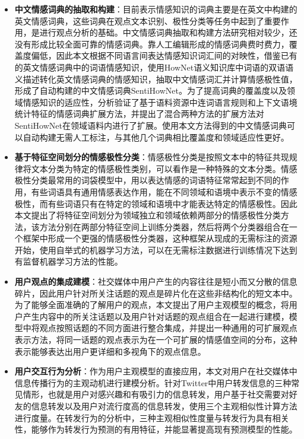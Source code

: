 \begin{cabstract}
\begin{itemize}
\item \textbf{中文情感词典的抽取和构建}：目前表示情感知识的词典主要是在英文中构建的英文情感词典，这些词典在观点文本识别、极性分类等任务中起到了重要作用，是进行观点分析的基础。中文情感词典抽取和构建方法研究相对较少，还没有形成比较全面可靠的情感词典。靠人工编辑形成的情感词典费时费力，覆盖度偏低，因此本文根据不同语言间表达情感知识词汇间的对映性，借鉴已有的英文情感词典中的词语情感知识，使用HowNet语义知识库中词语的双语语义描述转化英文情感词典的情感知识，抽取中文情感词汇并计算情感极性值，形成了自动构建的中文情感词典SentiHowNet。为了提高词典的覆盖度以及领域情感知识的适应性，分析验证了基于语料资源中连词语言规则和上下文语境统计特征的情感词典扩展方法，并提出了混合两种方法的扩展方法对SentiHowNet在领域语料内进行了扩展。使用本文方法得到的中文情感词典可以自动构建无需人工标注，与其他几个词典相比覆盖度和领域适应性更好。
\item \textbf{基于特征空间划分的情感极性分类}：情感极性分类是按照文本中的特征共现规律将文本分类为特定的情感极性类别，可以看作是一种特殊的文本分类。情感极性分类最常用的词袋模型中，用以表达情感的词语特征常常起到不同的作用，有些词语具有通用情感表达作用，能在不同领域和语境中表示不变的情感极性，而有些词语只有在特定的领域和语境中才能表达特定的情感极性。因此本文提出了将特征空间划分为领域独立和领域依赖两部分的情感极性分类方法，该方法分别在两部分特征空间上训练分类器，然后将两个分类器组合在一个框架中形成一个更强的情感极性分类器，这种框架从现成的无需标注的资源开始，使用自举式的机器学习方法，可以在无需标注数据进行训练情况下达到有监督机器学习方法的性能。
\item \textbf{用户观点的集成建模}：社交媒体中用户产生的内容往往是短小而又分散的信息碎片，因此用户针对所关注话题的观点是碎片化在这些非结构化的短文本中。为了能够全面准确的了解用户的观点，本文提出了用户主观模型的概念，将用户产生内容中的所关注话题以及用户针对话题的观点组合在一起进行建模，模型中将观点按照话题的不同方面进行整合集成，并提出一种通用的可扩展观点表示方法，将同一话题的观点表示为在一个可扩展的情感值空间的分布，这种表示能够表达出用户更详细和多视角下的观点信息。
\item \textbf{用户交互行为分析}：作为用户主观模型的直接应用，本文对用户在社交媒体中信息传播行为的主观动机进行建模分析。针对Twitter中用户转发信息的三种常见情形，也就是用户对感兴趣和有吸引力的信息转发，用户基于社交需要对好友的信息转发以及用户对流行度高的信息转发，使用三个主观相似性计算方法进行度量。在转发行为的分析中，三种主观相似性度量与转发行为具有相关性，能够作为转发行为预测的有用特征，并能显著提高现有预测模型的性能。
\end{itemize}


\end{cabstract}
